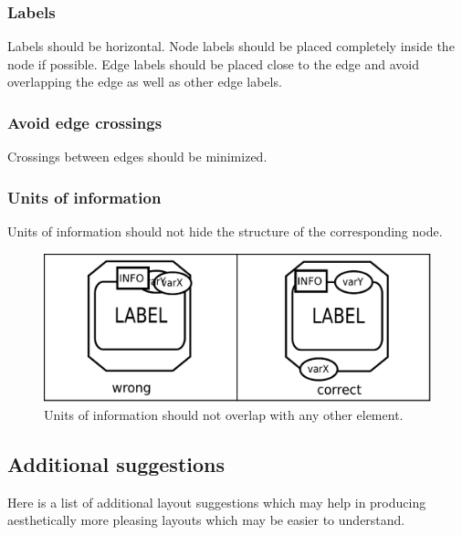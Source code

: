 \subsubsection{Labels}

Labels should be horizontal. Node labels should be placed completely
inside the node if possible. Edge labels should be placed close to
the edge and avoid overlapping the edge as well as other edge
labels.

\subsubsection{Avoid edge crossings}

Crossings between edges should be minimized.

\subsubsection{Units of information}

Units of information should not hide the structure of the
corresponding node.

\begin{figure}[h!]
  \centering
  \includegraphics[scale=0.5]{images/layout-unit-information}
  \caption{Units of information should not overlap with any
  other element.}\label{layout7}
\end{figure}

\newpage
\subsection{Additional suggestions}

Here is a list of additional layout suggestions which may help in
producing aesthetically more pleasing layouts which may be easier to
understand.

